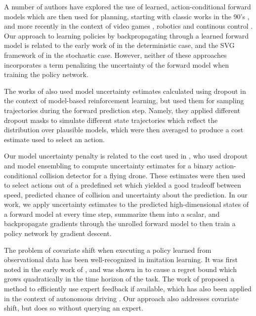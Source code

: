 \documentclass{article} %
\begin{document}
A number of authors have explored the use of learned, action-conditional forward models which are then used for planning, starting with classic works in the 90's \citep{Nguyen1990, Schmidhuber1990, Jordan1992}, and more recently in the context of video games \citep{Oh15, Pascanu17, I2A}, robotics and continous control \citep{FinnGL16, Poke, Nagabandi2017, UPN}.
Our approach to learning policies by backpropagating through a learned forward model is related to the early work of \citep{Nguyen1989} in the deterministic case, and the SVG framework of \citep{SVG} in the stochastic case. However, neither of these approaches incorporates a term penalizing the uncertainty of the forward model when training the policy network.

The works of \citep{DeepPilco, Chua2018} also used model uncertainty estimates calculated using dropout in the context of model-based reinforcement learning, but used them for sampling trajectories during the forward prediction step. Namely, they applied different dropout masks to simulate different state trajectories which reflect the distribution over plausible models, which were then averaged to produce a cost estimate used to select an action.

Our model uncertainty penalty is related to the cost used in \citep{Kahn2017}, who used dropout and model ensembling to compute uncertainty estimates for a binary action-conditional collision detector for a flying drone. These estimates were then used to select actions out of a predefined set which yielded a good tradeoff between speed, predicted chance of collision and uncertainty about the prediction. In our work, we apply uncertainty estimates to the predicted high-dimensional states of a forward model at every time step, summarize them into a scalar, and backpropagate gradients through the unrolled forward model to then train a policy network by gradient descent.


The problem of covariate shift when executing a policy learned from observational data has been well-recognized in imitation learning.
It was first noted in the early work of \citep{Pomerleau91}, and was shown in \citep{Ross2010EfficientRF} to cause a regret bound which grows quadratically in the time horizon of the task.
The work of \citep{Dagger} proposed a method to efficiently use expert feedback if available, which has also been applied in the context of autonomous driving \citep{Zhang16}.
Our approach also addresses covariate shift, but does so without querying an expert.
\end{document}
